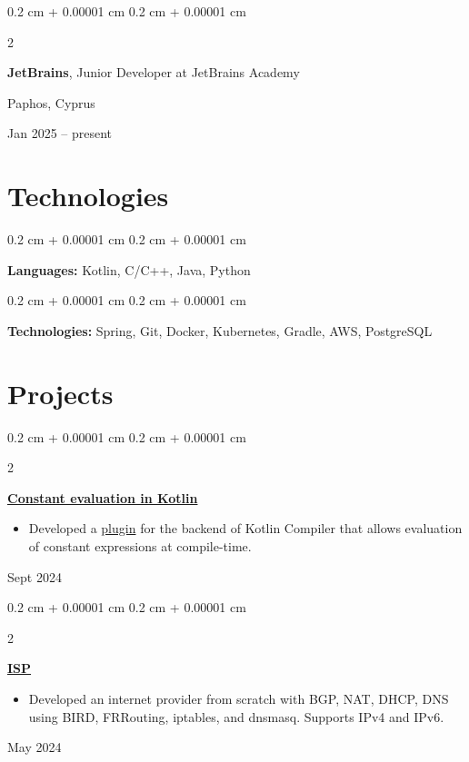 \documentclass[10pt, letterpaper]{article}
\newenvironment{highlights}{
    \begin{itemize}[
        topsep=0.10 cm,
        parsep=0.10 cm,
        partopsep=0pt,
        itemsep=0pt,
        leftmargin=0.4 cm + 10pt
    ]
}{
    \end{itemize}
} %
\newenvironment{onecolentry}{
    \begin{adjustwidth}{
        0.2 cm + 0.00001 cm
    }{
        0.2 cm + 0.00001 cm
    }
}{
    \end{adjustwidth}
} %
\newenvironment{twocolentry}[2][]{
    \onecolentry
    \def\secondColumn{#2}
    \setcolumnwidth{\fill, 4.5 cm}
    \begin{paracol}{2}
}{
    \switchcolumn \raggedleft \secondColumn
    \end{paracol}
    \endonecolentry
} %
\begin{document}
        \vspace{0.2 cm}

        \begin{twocolentry}{
            Paphos, Cyprus

        Jan 2025 – present
        }
            \textbf{JetBrains}, Junior Developer at JetBrains Academy
        \end{twocolentry}



    
    \section{Technologies}



        
        \begin{onecolentry}
            \textbf{Languages:} Kotlin, C/C++, Java, Python
        \end{onecolentry}

        \vspace{0.2 cm}

        \begin{onecolentry}
            \textbf{Technologies:} Spring, Git, Docker, Kubernetes, Gradle, AWS, PostgreSQL
        \end{onecolentry}


    
    \section{Projects}



        
        \begin{twocolentry}{
            Sept 2024
        }
            \textbf{\href{https://drive.google.com/file/d/1AD9tS-M0FZX2eGw5dcnHjX_YyEh3BLGl/view?usp=sharing}{Constant evaluation in Kotlin}}
            \begin{highlights}
                \item Developed a \href{https://github.com/SonyaBurg/kotlin-constexpr-support}{plugin} for the backend of Kotlin Compiler that allows evaluation of constant expressions at compile-time.
            \end{highlights}
        \end{twocolentry}


        \vspace{0.2 cm}

        \begin{twocolentry}{
            May 2024
        }
            \textbf{\href{https://github.com/asahium/isp}{ISP}}
            \begin{highlights}
                \item Developed an internet provider from scratch with BGP, NAT, DHCP, DNS using BIRD, FRRouting, iptables, and dnsmasq. Supports IPv4 and IPv6.
            \end{highlights}
        \end{twocolentry}
\end{document}
